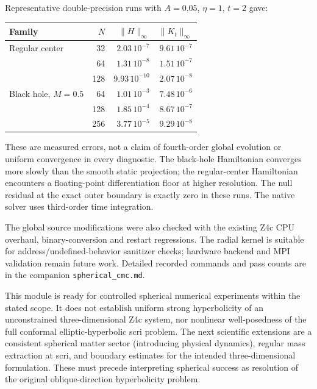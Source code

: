 \documentclass[11pt]{article}
\newcommand{\pathfile}[1]{\nolinkurl{#1}}
\begin{document}
Representative double-precision runs with $A=0.05$, $\eta=1$, $t=2$ gave:
\begin{center}
\begin{tabular}{lrrr}
\toprule Family & $N$ & $\|H\|_\infty$ & $\|K_t\|_\infty$\\\midrule
Regular center &32&$2.03\,10^{-7}$&$9.61\,10^{-7}$\\
 &64&$1.31\,10^{-8}$&$1.51\,10^{-7}$\\
 &128&$9.93\,10^{-10}$&$2.07\,10^{-8}$\\
Black hole, $M=0.5$ &64&$1.01\,10^{-3}$&$7.48\,10^{-6}$\\
 &128&$1.85\,10^{-4}$&$8.67\,10^{-7}$\\
 &256&$3.77\,10^{-5}$&$9.29\,10^{-8}$\\\bottomrule
\end{tabular}
\end{center}
These are measured errors, not a claim of fourth-order global evolution or
uniform convergence in every diagnostic. The black-hole Hamiltonian converges
more slowly than the smooth static projection; the regular-center Hamiltonian
encounters a floating-point differentiation floor at higher resolution. The
null residual at the exact outer boundary is exactly zero in these runs. The
native solver uses third-order time integration.

The global source modifications were also checked with the existing Z4c
CPU overhaul, binary-conversion and restart regressions. The radial kernel is
suitable for address/undefined-behavior sanitizer checks; hardware backend and
MPI validation remain future work. Detailed recorded commands and pass counts
are in the companion \pathfile{spherical_cmc.md}.

This module is ready for controlled spherical numerical experiments within the
stated scope. It does not establish uniform strong hyperbolicity of an
unconstrained three-dimensional Z4c system, nor nonlinear well-posedness of the
full conformal elliptic-hyperbolic scri problem. The next scientific extensions
are a consistent spherical matter sector (introducing physical dynamics),
regular mass extraction at scri, and boundary estimates for the intended
three-dimensional formulation. These must precede interpreting spherical
success as resolution of the original oblique-direction hyperbolicity problem.
\end{document}
